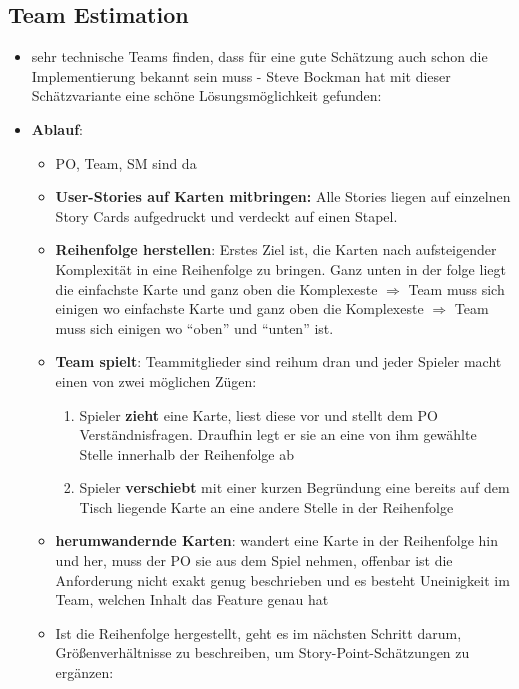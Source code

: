 \subsection{Team Estimation}
\begin{itemize}
  \item sehr technische Teams finden, dass für eine gute Schätzung auch schon die
    Implementierung bekannt sein muss - Steve Bockman hat mit dieser Schätzvariante eine
    schöne Lösungsmöglichkeit gefunden:
  \item \textbf{Ablauf}:
    \begin{itemize}
      \item PO, Team, SM sind da
      \item \textbf{User-Stories auf Karten mitbringen:} Alle Stories liegen auf einzelnen Story
        Cards aufgedruckt und verdeckt auf einen Stapel.
      \item \textbf{Reihenfolge herstellen}: Erstes Ziel ist, die Karten nach aufsteigender
        Komplexität in eine Reihenfolge zu bringen. Ganz unten in der folge liegt die
        einfachste Karte und ganz oben die Komplexeste $\Rightarrow$  Team muss sich einigen wo
        einfachste Karte und ganz oben die Komplexeste $\Rightarrow$  Team muss sich einigen wo
      \enquote{oben} und \enquote{unten} ist.
      \item \textbf{Team spielt}: Teammitglieder sind reihum dran und jeder Spieler macht einen von
        zwei möglichen Zügen:
        \begin{enumerate}
          \item Spieler \textbf{zieht} eine Karte, liest diese vor und stellt dem PO Verständnisfragen.
            Draufhin legt er sie an eine von ihm gewählte Stelle innerhalb der Reihenfolge ab
          \item Spieler \textbf{verschiebt} mit einer kurzen Begründung eine bereits auf dem Tisch
            liegende Karte an eine andere Stelle in der Reihenfolge
        \end{enumerate}
      \item \textbf{herumwandernde Karten}: wandert eine Karte in der Reihenfolge hin und her,
        muss der PO sie aus dem Spiel nehmen, offenbar ist die Anforderung nicht exakt genug
        beschrieben und es besteht Uneinigkeit im Team, welchen Inhalt das Feature genau hat
      \item Ist die Reihenfolge hergestellt, geht es im nächsten Schritt darum,
        Größenverhältnisse zu beschreiben, um Story-Point-Schätzungen zu ergänzen:

\end{itemize}
\end{itemize}
